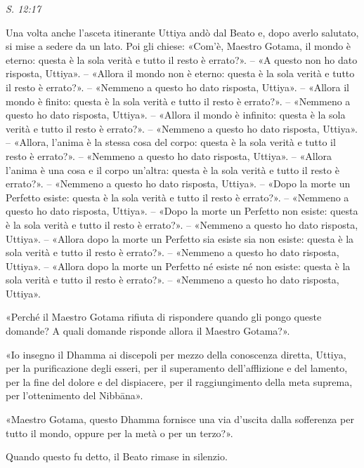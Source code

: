 \emph{S. 12:17}


Una volta anche l’asceta itinerante Uttiya andò dal Beato e, dopo averlo
salutato, si mise a sedere da un lato. Poi gli chiese: «Com’è, Maestro
Gotama, il mondo è eterno: questa è la sola verità e tutto il resto è
errato?». – «A questo non ho dato risposta, Uttiya». – «Allora il mondo
non è eterno: questa è la sola verità e tutto il resto è errato?». –
«Nemmeno a questo ho dato risposta, Uttiya». – «Allora il mondo è
finito: questa è la sola verità e tutto il resto è errato?». – «Nemmeno
a questo ho dato risposta, Uttiya». – «Allora il mondo è infinito:
questa è la sola verità e tutto il resto è errato?». – «Nemmeno a questo
ho dato risposta, Uttiya». – «Allora, l’anima è la stessa cosa del
corpo: questa è la sola verità e tutto il resto è errato?». – «Nemmeno a
questo ho dato risposta, Uttiya». – «Allora l’anima è una cosa e il
corpo un’altra: questa è la sola verità e tutto il resto è errato?». –
«Nemmeno a questo ho dato risposta, Uttiya». – «Dopo la morte un
Perfetto esiste: questa è la sola verità e tutto il resto è errato?». –
«Nemmeno a questo ho dato risposta, Uttiya». – «Dopo la morte un
Perfetto non esiste: questa è la sola verità e tutto il resto è
errato?». – «Nemmeno a questo ho dato risposta, Uttiya». – «Allora dopo
la morte un Perfetto sia esiste sia non esiste: questa è la sola verità
e tutto il resto è errato?». – «Nemmeno a questo ho dato risposta,
Uttiya». – «Allora dopo la morte un Perfetto né esiste né non esiste:
questa è la sola verità e tutto il resto è errato?». – «Nemmeno a questo
ho dato risposta, Uttiya».


«Perché il Maestro Gotama rifiuta di rispondere quando gli pongo queste
domande? A quali domande risponde allora il Maestro Gotama?».


«Io insegno il Dhamma ai discepoli per mezzo della conoscenza diretta,
Uttiya, per la purificazione degli esseri, per il superamento
dell’afflizione e del lamento, per la fine del dolore e del dispiacere,
per il raggiungimento della meta suprema, per l’ottenimento del
Nibbāna».


«Maestro Gotama, questo Dhamma fornisce una via d’uscita dalla
sofferenza per tutto il mondo, oppure per la metà o per un terzo?».


Quando questo fu detto, il Beato rimase in silenzio.


